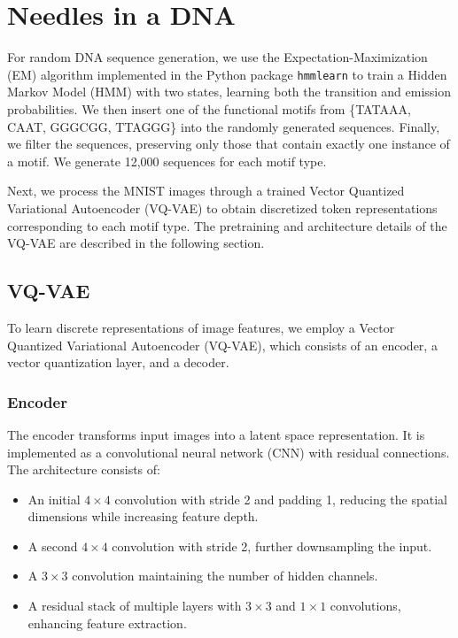 \section{Needles in a DNA}
\label{app:needle}

For random DNA sequence generation, we use the Expectation-Maximization (EM) algorithm implemented in the Python package \texttt{hmmlearn} to train a Hidden Markov Model (HMM) with two states, learning both the transition and emission probabilities. We then insert one of the functional motifs from \{TATAAA, CAAT, GGGCGG, TTAGGG\} into the randomly generated sequences. Finally, we filter the sequences, preserving only those that contain exactly one instance of a motif. We generate 12,000 sequences for each motif type.

Next, we process the MNIST images through a trained Vector Quantized Variational Autoencoder (VQ-VAE) to obtain discretized token representations corresponding to each motif type. The pretraining and architecture details of the VQ-VAE are described in the following section.


\subsection{VQ-VAE}

To learn discrete representations of image features, we employ a Vector Quantized Variational Autoencoder (VQ-VAE), which consists of an encoder, a vector quantization layer, and a decoder.

\subsubsection{Encoder}
The encoder transforms input images into a latent space representation. It is implemented as a convolutional neural network (CNN) with residual connections. The architecture consists of:

\begin{itemize}
    \item An initial $4 \times 4$ convolution with stride 2 and padding 1, reducing the spatial dimensions while increasing feature depth.
    \item A second $4 \times 4$ convolution with stride 2, further downsampling the input.
    \item A $3 \times 3$ convolution maintaining the number of hidden channels.
    \item A residual stack of multiple layers with $3 \times 3$ and $1 \times 1$ convolutions, enhancing feature extraction.
\end{itemize}

